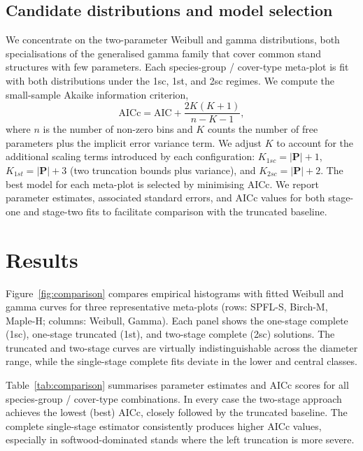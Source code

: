 \documentclass[12pt]{article}
\begin{document}
\subsection{Candidate distributions and model selection}
\label{sec:methods_candidates}

We concentrate on the two-parameter Weibull and gamma distributions, both specialisations of the generalised gamma family that cover common stand structures with few parameters. Each species-group / cover-type meta-plot is fit with both distributions under the 1sc, 1st, and 2sc regimes. We compute the small-sample Akaike information criterion,
\begin{equation}
  \text{AICc} = \text{AIC} + \frac{2K(K+1)}{n - K - 1},
\end{equation}
where $n$ is the number of non-zero bins and $K$ counts the number of free parameters plus the implicit error variance term. We adjust $K$ to account for the additional scaling terms introduced by each configuration: $K_{1sc} = |\bm{P}| + 1$, $K_{1st} = |\bm{P}| + 3$ (two truncation bounds plus variance), and $K_{2sc} = |\bm{P}| + 2$. The best model for each meta-plot is selected by minimising AICc. We report parameter estimates, associated standard errors, and AICc values for both stage-one and stage-two fits to facilitate comparison with the truncated baseline.

\section{Results}
\label{sec:results}

Figure~\ref{fig:comparison} compares empirical histograms with fitted Weibull and gamma curves for three representative meta-plots (rows: SPFL-S, Birch-M, Maple-H; columns: Weibull, Gamma). Each panel shows the one-stage complete (1sc), one-stage truncated (1st), and two-stage complete (2sc) solutions. The truncated and two-stage curves are virtually indistinguishable across the diameter range, while the single-stage complete fits deviate in the lower and central classes.

Table~\ref{tab:comparison} summarises parameter estimates and AICc scores for all species-group / cover-type combinations. In every case the two-stage approach achieves the lowest (best) AICc, closely followed by the truncated baseline. The complete single-stage estimator consistently produces higher AICc values, especially in softwood-dominated stands where the left truncation is more severe.
\end{document}
